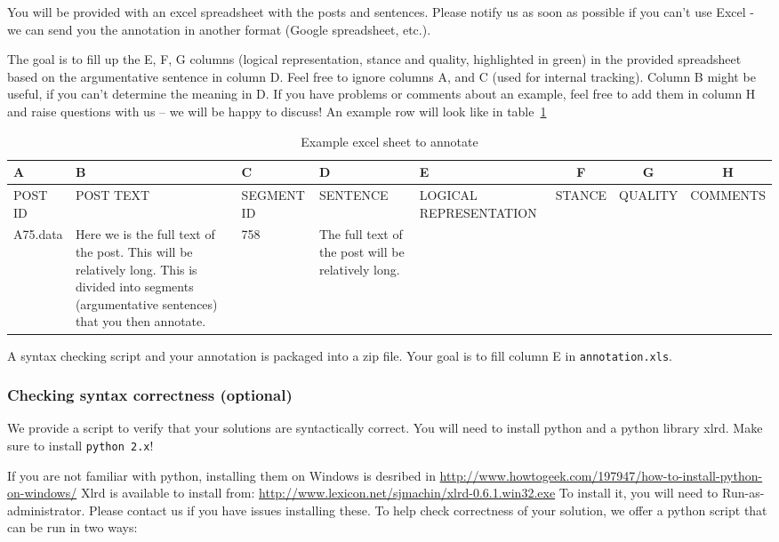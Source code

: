 You will be provided with an excel spreadsheet with the posts and sentences.
Please notify us as soon as possible if you can’t use Excel - we can send you
the annotation in another format (Google spreadsheet, etc.). 

The goal is to fill up the E, F, G columns (logical representation, stance and
quality, highlighted in green) in the provided spreadsheet based on the
argumentative sentence in column D. Feel free to ignore columns A, and C (used
for internal tracking). Column B might be useful, if you can’t determine the
meaning in D. If you have problems or comments about an example, feel free to
add them in column H and raise questions with us -- we will be happy to
discuss! An example row will look like in table~\ref{tab:annotation_example}

\begin{table}[!htb]
\scriptsize
\begin{tabular}{|p{1.5cm} | p{2cm} | p{2cm} | p{2cm} | p{2cm} |c| c| c|}
\toprule
A & B & C & D & E & F & G & H \\
\midrule
POST ID & POST TEXT & SEGMENT ID & SENTENCE & LOGICAL REPRESENTATION
& STANCE & QUALITY & COMMENTS \\
\midrule
A75.data & 
Here we is the full text of the post. This will be relatively long.
This is divided into segments (argumentative sentences) that you then annotate. 
& 758 & 
The full text of the post will be relatively long.  
& \cellcolor{green!25} &  \cellcolor{green!25}& \cellcolor{green!25} & \cellcolor{green!25} \\
\bottomrule
\end{tabular}
\caption{Example excel sheet to annotate}
\label{tab:annotation_example}
\end{table}

A syntax checking script and your annotation is packaged into a zip file.  Your goal is to
fill column E in \texttt{annotation.xls}.

\subsubsection{Checking syntax correctness (optional)}

We provide a script to verify that your solutions are syntactically correct. 
You will need to install python and a python library xlrd. Make sure to install
\texttt{python 2.x}!

If you are not familiar with python, installing them on Windows is desribed in
\url{http://www.howtogeek.com/197947/how-to-install-python-on-windows/}
Xlrd is available to install from:
\url{http://www.lexicon.net/sjmachin/xlrd-0.6.1.win32.exe} 
To install it, you will need to Run-as-administrator. 
Please contact us if you have issues installing these. 
To help check correctness of your solution, we offer a python script that can
be run in two ways:

